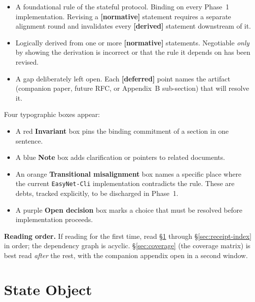 \documentclass[11pt,a4paper]{article}
\newcommand{\normsv}{\textcolor{normativecolor}{\textbf{[normative]}}\xspace}
\newcommand{\derived}{\textcolor{derivedcolor}{\textbf{[derived]}}\xspace}
\newcommand{\deferred}{\textcolor{deferredcolor}{\textbf{[deferred]}}\xspace}
\theoremstyle{definition}
\begin{document}
\begin{itemize}[leftmargin=2.4em,itemsep=0.3em]
    \item[\normsv] A foundational rule of the stateful protocol.
    Binding on every Phase~1 implementation. Revising a
    \normsv{} statement requires a separate alignment round and
    invalidates every \derived{} statement downstream of it.

    \item[\derived] Logically derived from one or more \normsv{}
    statements. Negotiable \emph{only} by showing the derivation
    is incorrect or that the rule it depends on has been revised.

    \item[\deferred] A gap deliberately left open. Each \deferred{}
    point names the artifact (companion paper, future RFC, or
    Appendix~B sub-section) that will resolve it.
\end{itemize}

Four typographic boxes appear:

\begin{itemize}[leftmargin=2.4em,itemsep=0.3em]
    \item A red \textbf{Invariant} box pins the binding commitment of
    a section in one sentence.
    \item A blue \textbf{Note} box adds clarification or pointers to
    related documents.
    \item An orange \textbf{Transitional misalignment} box names a
    specific place where the current \texttt{EasyNet-Cli}
    implementation contradicts the rule. These are debts, tracked
    explicitly, to be discharged in Phase~1.
    \item A purple \textbf{Open decision} box marks a choice that
    must be resolved before implementation proceeds.
\end{itemize}

\textbf{Reading order.} If reading for the first time, read
\S\ref{sec:state-object} through \S\ref{sec:receipt-index} in order;
the dependency graph is acyclic. \S\ref{sec:coverage} (the coverage
matrix) is best read \emph{after} the rest, with the companion
appendix open in a second window.

\section{State Object}
\label{sec:state-object}
\end{document}
